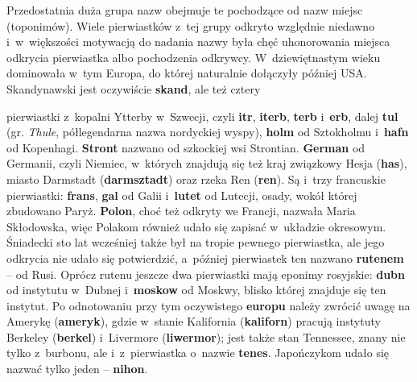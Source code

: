 \begin{dwieszpalty}

Przedostatnia duża grupa nazw obejmuje te pochodzące od nazw miejsc
(toponimów). Wiele  pierwiastków z~tej grupy odkryto względnie niedawno i~w~większości motywacją do nadania nazwy była chęć uhonorowania miejsca
odkrycia pierwiastka albo pochodzenia odkrywcy. W~dziewiętnastym wieku
dominowała %
w~tym Europa, do której naturalnie dołączyły później USA.
Skandynawski jest oczywiście \textbf{skand}, ale też cztery
\end{dwieszpalty}\eject pierwiastki
z~kopalni Ytterby w~Szwecji, czyli \textbf{itr}, \textbf{iterb},
\textbf{terb} i~\textbf{erb}, dalej \textbf{tul} (gr. \emph{Thule},
półlegendarna nazwa nordyckiej wyspy), \textbf{holm} od Sztokholmu i~\textbf{hafn} od Kopenhagi. \textbf{Stront} nazwano od szkockiej wsi
Strontian. \textbf{German} od Germanii, czyli Niemiec, w~których
znajdują się też kraj związkowy Hesja (\textbf{has}), miasto Darmstadt
(\textbf{darmsztadt}) oraz rzeka Ren (\textbf{ren}). Są i~trzy
francuskie pierwiastki: \textbf{frans}, \textbf{gal} od Galii i~\textbf{lutet} od Lutecji, osady, wokół której zbudowano Paryż.
\textbf{Polon}, choć też odkryty we Francji, nazwała Maria Skłodowska,
więc Polakom również udało się zapisać w~układzie okresowym. Śniadecki
sto lat wcześniej także był na tropie
pewnego pierwiastka, ale jego odkrycia nie udało się potwierdzić, a~później pierwiastek ten
nazwano \textbf{rutenem} -- od Rusi. 
Oprócz rutenu
jeszcze dwa pierwiastki mają eponimy rosyjskie: \textbf{dubn} od
instytutu w~Dubnej i~\textbf{moskow} od Moskwy, blisko której znajduje
się ten instytut. Po odnotowaniu przy tym oczywistego \textbf{europu}
należy zwrócić uwagę na Amerykę (\textbf{ameryk}), gdzie w~stanie
Kalifornia (\textbf{kaliforn}) pracują instytuty Berkeley
(\textbf{berkel}) i~Livermore (\textbf{liwermor}); jest także stan
Tennessee, znany nie tylko z~burbonu, ale i~z~pierwiastka o~nazwie
\textbf{tenes}. Japończykom udało się nazwać tylko jeden --
\textbf{nihon}.



